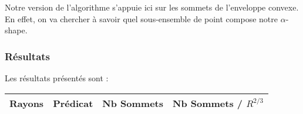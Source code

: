 Notre version de l'algorithme s'appuie ici sur les sommets de l'enveloppe convexe. En effet, on va chercher à savoir quel sous-ensemble de point compose notre $\alpha$-shape.

\subsubsection{Résultats}

Les résultats présentés sont : 

\begin{tabular}{|l|c||c|c|}
\hline
Rayons & Prédicat & Nb Sommets & Nb Sommets / $R^{2/3}$\\
\hline

\hline
\end{tabular} 


